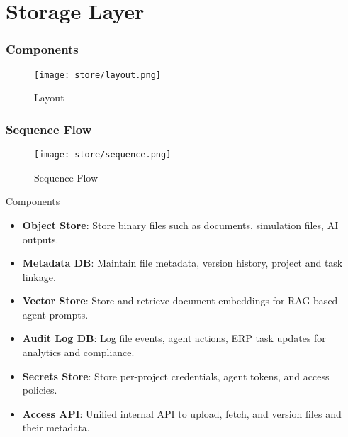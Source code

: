 \section{Storage Layer}


\begin{frame}
    \frametitle{ Components}
    \begin{figure}
        \centering
        \texttt{[image: store/layout.png]} %
        \caption{Layout}
    \end{figure}
\end{frame}

\begin{frame}
    \frametitle{Sequence Flow}
    \begin{figure}
        \centering
        \texttt{[image: store/sequence.png]} %
        \caption{Sequence Flow}
    \end{figure}
\end{frame}
\begin{frame}{Components}
    \begin{itemize}
        \item \textbf{Object Store}: Store binary files such as documents, simulation files, AI outputs.
        \item \textbf{Metadata DB}: Maintain file metadata, version history, project and task linkage.
        \item \textbf{Vector Store}: Store and retrieve document embeddings for RAG-based agent prompts.
        \item \textbf{Audit Log DB}: Log file events, agent actions, ERP task updates for analytics and compliance.
        \item \textbf{Secrets Store}: Store per-project credentials, agent tokens, and access policies.
        \item \textbf{Access API}: Unified internal API to upload, fetch, and version files and their metadata.
    \end{itemize}
\end{frame}

